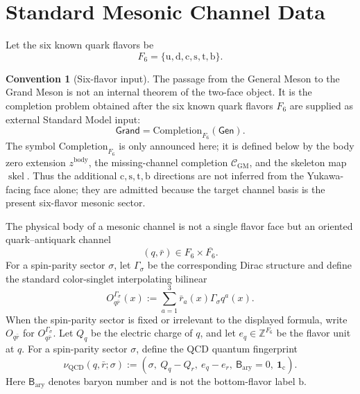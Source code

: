 \documentclass[11pt]{article}
\theoremstyle{definition}
\newtheorem{convention}[definition]{Convention}
\theoremstyle{plain}
\DeclareMathOperator{\skel}{skel}
\newcommand{\qu}{\mathrm u}
\newcommand{\qd}{\mathrm d}
\newcommand{\qc}{\mathrm c}
\newcommand{\qs}{\mathrm s}
\newcommand{\qt}{\mathrm t}
\newcommand{\qb}{\mathrm b}
\begin{document}
\section{Standard Mesonic Channel Data}

Let the six known quark flavors be
\[
  F_6=\{\qu,\qd,\qc,\qs,\qt,\qb\}.
\]

\begin{convention}[Six-flavor input]
The passage from the General Meson to the Grand Meson is not an internal
theorem of the two-face object.  It is the completion problem obtained
after the six known quark flavors \(F_6\) are supplied as external Standard
Model input:
\[
  \mathsf{Grand}
  =
  \mathrm{Completion}_{F_6}(\mathsf{Gen}).
\]
The symbol \(\mathrm{Completion}_{F_6}\) is only announced here; it is
defined below by the body zero extension
\(z^{\mathrm{body}}\), the missing-channel completion
\(\mathcal C_{\mathrm{GM}}\), and the skeleton map \(\skel\).
Thus the additional \(\qc,\qs,\qt,\qb\) directions are not inferred from
the Yukawa-facing face alone; they are admitted because the target channel
basis is the present six-flavor mesonic sector.
\end{convention}

The physical body of a mesonic channel is not a single flavor face but an
oriented quark--antiquark channel
\[
  (q,\bar r)\in F_6\times \overline{F_6}.
\]
For a spin-parity sector \(\sigma\), let \(\Gamma_\sigma\) be the
corresponding Dirac structure and define the standard color-singlet
interpolating bilinear
\[
  O^{\Gamma_\sigma}_{q\bar r}(x)
  :=
  \sum_{a=1}^{3}\bar r_a(x)\Gamma_\sigma q^a(x).
\]
When the spin-parity sector is fixed or irrelevant to the displayed
formula, write \(O_{q\bar r}\) for \(O^{\Gamma_\sigma}_{q\bar r}\).
Let \(Q_q\) be the electric charge of \(q\), and let
\(e_q\in\mathbb Z^{F_6}\) be the flavor unit at \(q\).  For a spin-parity
sector \(\sigma\), define the QCD quantum fingerprint
\[
  \nu_{\mathrm{QCD}}(q,\bar r;\sigma)
  :=
  (\sigma,\ Q_q-Q_r,\ e_q-e_r,\ \mathsf B_{\mathrm{ary}}=0,\
  \mathbf 1_{\mathrm c}).
\]
Here \(\mathsf B_{\mathrm{ary}}\) denotes baryon number and is not the
bottom-flavor label \(\qb\).
\end{document}

